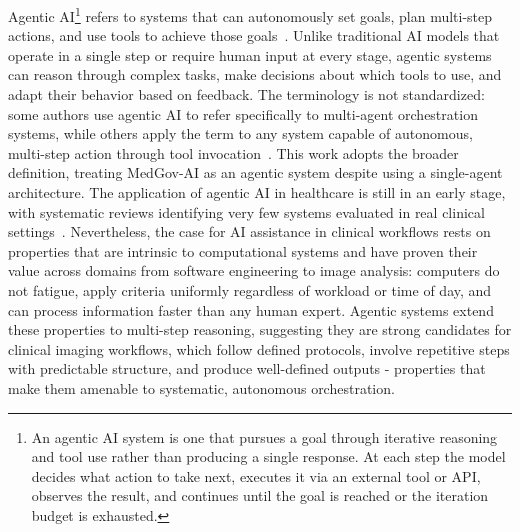 \documentclass[conference]{IEEEtran}
\begin{document}
Agentic AI\footnote{An agentic AI system is one that pursues a goal through iterative reasoning and tool use rather than producing a single response. At each step the model decides what action to take next, executes it via an external tool or API, observes the result, and continues until the goal is reached or the iteration budget is exhausted.} refers to systems that can autonomously set goals, plan multi-step actions, and use tools to achieve those goals~\cite{collaco2026scoping}. Unlike traditional AI models that operate in a single step or require human input at every stage, agentic systems can reason through complex tasks, make decisions about which tools to use, and adapt their behavior based on feedback. The terminology is not standardized: some authors use agentic AI to refer specifically to multi-agent orchestration systems, while others apply the term to any system capable of autonomous, multi-step action through tool invocation~\cite{abouali2026survey}. This work adopts the broader definition, treating MedGov-AI as an agentic system despite using a single-agent architecture. The application of agentic AI in healthcare is still in an early stage, with systematic reviews identifying very few systems evaluated in real clinical settings~\cite{collaco2026scoping, dietrich2025agentic}. Nevertheless, the case for AI assistance in clinical workflows rests on properties that are intrinsic to computational systems and have proven their value across domains from software engineering to image analysis: computers do not fatigue, apply criteria uniformly regardless of workload or time of day, and can process information faster than any human expert. Agentic systems extend these properties to multi-step reasoning, suggesting they are strong candidates for clinical imaging workflows, which follow defined protocols, involve repetitive steps with predictable structure, and produce well-defined outputs - properties that make them amenable to systematic, autonomous orchestration.
\end{document}
